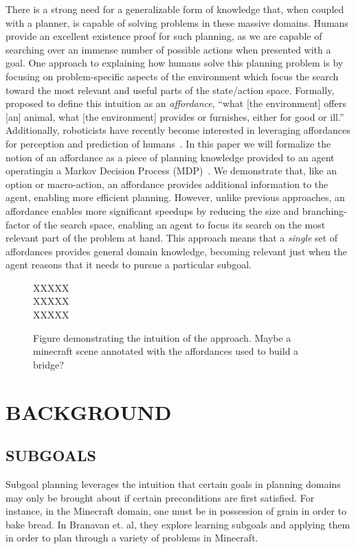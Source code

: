 \documentclass[]{article}
\begin{document}
There is a strong need for a generalizable form of knowledge that,
when coupled with a planner, is capable of solving problems in these
massive domains. Humans provide an excellent existence proof for such
planning, as we are capable of searching over an immense number of
possible actions when presented with a goal.  One approach to
explaining how humans solve this planning problem is by focusing on
problem-specific aspects of the environment which focus the search
toward the most relevant and useful parts of the state/action space.
Formally, \citet{gibson77} proposed to define this intuition as an
{\em affordance}, ``what [the environment] offers [an] animal, what
[the environment] provides or furnishes, either for good or ill.''
Additionally, roboticists have recently become interested in
leveraging affordances for perception and prediction of
humans~\citep{koppula13a, koppula13b}. In this paper we will formalize
the notion of an affordance as a piece of planning knowledge provided
to an agent operatingin a Markov Decision Process
(MDP)~\citep{kaelbling99}.  We demonstrate that, like an option or
macro-action, an affordance provides additional information to the
agent, enabling more efficient planning.  However, unlike previous
approaches, an affordance enables more significant speedups by
reducing the size and branching-factor of the search space, enabling
an agent to focus its search on the most relevant part of the problem
at hand.  This approach means that a {\em single} set of affordances
provides general domain knowledge, becoming relevant just when the
agent reasons that it needs to pursue a particular subgoal.  


\begin{figure}
\parbox{1\linewidth}{
XXXXX~\\
XXXXX~\\
XXXXX~\\
}
\caption{Figure demonstrating the intuition of the approach.  Maybe a
  minecraft scene annotated with the affordances used to build a
  bridge?\label{fig:example}}
\end{figure}

\section{BACKGROUND}

\subsection{SUBGOALS}
Subgoal planning leverages the intuition that certain goals in planning domains may only be brought about if certain preconditions are first satisfied. For instance, in the Minecraft domain, one must be in possession of grain in order to bake bread. In Branavan et. al, they explore learning subgoals and applying them in order to plan through a variety of problems in Minecraft.
\end{document}

